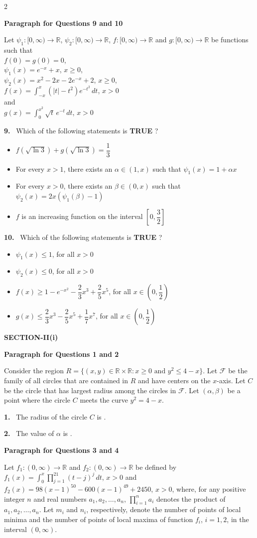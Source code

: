 \documentclass[10pt]{extarticle}
\newcommand{\sect}[1]{\par\smallskip\noindent\textbf{#1}\par}
\newcommand{\qn}[1]{\par\smallskip\noindent\textbf{#1.}~}
\newcommand{\paraq}[2]{\par\smallskip\noindent\textbf{Paragraph for Questions #1 and #2}\par}
\newenvironment{qoptions}{\begin{itemize}[leftmargin=1.8em,itemsep=1pt,topsep=2pt,label={}]}{\end{itemize}}
\newcommand{\opt}[2]{\item[(#1)] #2}
\begin{document}
\begin{multicols}{2}
\paraq{9}{10}
Let $\psi_1:[0,\infty)\to\mathbb R$, $\psi_2:[0,\infty)\to\mathbb R$, $f:[0,\infty)\to\mathbb R$ and $g:[0,\infty)\to\mathbb R$ be functions such that\\
$f(0)=g(0)=0$,\\
$\psi_1(x)=e^{-x}+x$, $x\ge0$,\\
$\psi_2(x)=x^2-2x-2e^{-x}+2$, $x\ge0$,\\
$f(x)=\displaystyle\int_{-x}^{x}\left(|t|-t^2\right)e^{-t^2}\,dt$, $x>0$\\
and\\
$g(x)=\displaystyle\int_0^{x^2}\sqrt t\,e^{-t}\,dt$, $x>0$

\qn{9} Which of the following statements is \textbf{TRUE} ?
\begin{qoptions}
\opt{A}{$f\left(\sqrt{\ln3}\right)+g\left(\sqrt{\ln3}\right)=\dfrac13$}
\opt{B}{For every $x>1$, there exists an $\alpha\in(1,x)$ such that $\psi_1(x)=1+\alpha x$}
\opt{C}{For every $x>0$, there exists an $\beta\in(0,x)$ such that $\psi_2(x)=2x(\psi_1(\beta)-1)$}
\opt{D}{$f$ is an increasing function on the interval $\left[0,\dfrac32\right]$}
\end{qoptions}

\qn{10} Which of the following statements is \textbf{TRUE} ?
\begin{qoptions}
\opt{A}{$\psi_1(x)\le1$, for all $x>0$}
\opt{B}{$\psi_2(x)\le0$, for all $x>0$}
\opt{C}{$f(x)\ge1-e^{-x^2}-\dfrac23x^3+\dfrac25x^5$, for all $x\in\left(0,\dfrac12\right)$}
\opt{D}{$g(x)\le\dfrac23x^3-\dfrac25x^5+\dfrac17x^7$, for all $x\in\left(0,\dfrac12\right)$}
\end{qoptions}

\sect{SECTION-II(i)}
\paraq{1}{2}
Consider the region $R=\{(x,y)\in\mathbb R\times\mathbb R:x\ge0\text{ and }y^2\le4-x\}$. Let $\mathcal F$ be the family of all circles that are contained in $R$ and have centers on the $x$-axis. Let $C$ be the circle that has largest radius among the circles in $\mathcal F$. Let $(\alpha,\beta)$ be a point where the circle $C$ meets the curve $y^2=4-x$.

\qn{1} The radius of the circle $C$ is \underline{\hspace{2.5em}}.

\qn{2} The value of $\alpha$ is \underline{\hspace{2.5em}}.

\paraq{3}{4}
Let $f_1:(0,\infty)\to\mathbb R$ and $f_2:(0,\infty)\to\mathbb R$ be defined by $f_1(x)=\displaystyle\int_0^x\prod_{j=1}^{21}(t-j)^j\,dt$, $x>0$ and $f_2(x)=98(x-1)^{50}-600(x-1)^{49}+2450$, $x>0$, where, for any positive integer $n$ and real numbers $a_1,a_2,\dots,a_n$, $\displaystyle\prod_{i=1}^{n}a_i$ denotes the product of $a_1,a_2,\dots,a_n$. Let $m_i$ and $n_i$, respectively, denote the number of points of local minima and the number of points of local maxima of function $f_i$, $i=1,2$, in the interval $(0,\infty)$.


\end{multicols}
\end{document}

